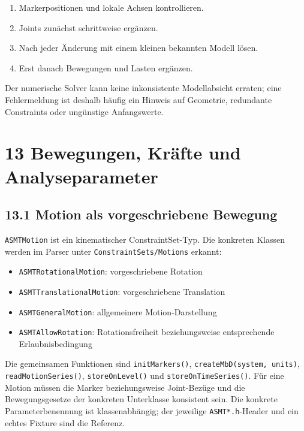 \documentclass[
  12pt
]{book}
\providecommand{\tightlist}{%
  \setlength{\itemsep}{0pt}\setlength{\parskip}{0pt}}
\begin{document}
\begin{enumerate}
\def\labelenumi{\arabic{enumi}.}
\tightlist
\item
  Markerpositionen und lokale Achsen kontrollieren.
\item
  Joints zunächst schrittweise ergänzen.
\item
  Nach jeder Änderung mit einem kleinen bekannten Modell lösen.
\item
  Erst danach Bewegungen und Lasten ergänzen.
\end{enumerate}

Der numerische Solver kann keine inkonsistente Modellabsicht erraten;
eine Fehlermeldung ist deshalb häufig ein Hinweis auf Geometrie,
redundante Constraints oder ungünstige Anfangswerte.

\hypertarget{kap-bewegungen-kraefte}{%
\chapter{\texorpdfstring{{13} Bewegungen, Kräfte und
Analyseparameter}{13 Bewegungen, Kräfte und Analyseparameter}}\label{kap-bewegungen-kraefte}}

\hypertarget{motion-als-vorgeschriebene-bewegung}{%
\section{\texorpdfstring{{13.1} Motion als vorgeschriebene
Bewegung}{13.1 Motion als vorgeschriebene Bewegung}}\label{motion-als-vorgeschriebene-bewegung}}

\texttt{ASMTMotion} ist ein kinematischer ConstraintSet-Typ. Die
konkreten Klassen werden im Parser unter \texttt{ConstraintSets/Motions}
erkannt:

\begin{itemize}
\tightlist
\item
  \texttt{ASMTRotationalMotion}: vorgeschriebene Rotation
\item
  \texttt{ASMTTranslationalMotion}: vorgeschriebene Translation
\item
  \texttt{ASMTGeneralMotion}: allgemeinere Motion-Darstellung
\item
  \texttt{ASMTAllowRotation}: Rotationsfreiheit beziehungsweise
  entsprechende Erlaubnisbedingung
\end{itemize}

Die gemeinsamen Funktionen sind \texttt{initMarkers()},
\texttt{createMbD(system,\ units)}, \texttt{readMotionSeries()},
\texttt{storeOnLevel()} und \texttt{storeOnTimeSeries()}. Für eine
Motion müssen die Marker beziehungsweise Joint-Bezüge und die
Bewegungsgesetze der konkreten Unterklasse konsistent sein. Die konkrete
Parameterbenennung ist klassenabhängig; der jeweilige
\texttt{ASMT*.h}-Header und ein echtes Fixture sind die Referenz.
\end{document}
